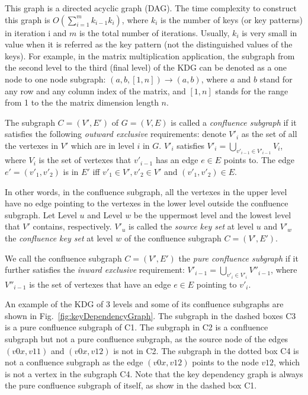 \documentclass[10pt,journal,compsoc]{IEEEtran}
\begin{document}
This graph is a directed acyclic graph (DAG).
The time complexity to construct this graph is $O(\sum_{i=1}^m k_{i-1} k_i)$, 
where $k_i$ is the number of keys (or key patterns) in iteration i and $m$ is the total number of iterations.
Usually, $k_i$ is very small in value when it is referred as the key pattern (not the distinguished values of the keys).
For example, in the matrix multiplication application, the subgraph from the second level to the third (final level) of the KDG can be denoted as a one node to one node subgraph: $(a, b, [1, n]) \rightarrow (a, b)$, 
where $a$ and $b$ stand for any row and any column index of the matrix, 
and $[1, n]$ stands for the range from 1 to the the matrix dimension length $n$.

The subgraph $C=(V', E')$ of $G=(V,E)$ is called a \emph{confluence subgraph} if it satisfies the following
\emph{outward exclusive} requirements: 
denote $V'_i$ as the set of all the vertexes in $V'$ which are in level $i$ in $G$.  
$V'_i$ satisfies $V'_i=\bigcup_{v'_{i-1} \in V'_{i-1}}V_i$, where $V_i$ is the set of vertexes that $v'_{i-1}$ has an edge $e \in E$ points to. 
The edge $e' =(v'_1,v'_2)$ is in $E'$ iff $v'_1 \in V', v'_2 \in V'$ and $(v'_1,v'_2) \in E$.

In other words, in the confluence subgraph, all the vertexes in the upper level have no edge pointing to
the vertexes in the lower level outside the confluence subgraph. 
Let Level $u$ and Level $w$ be the uppermost level and the lowest level that $V'$ contains, respectively. 
$V'_u$ is called the \emph{source key set} at level $u$ and $V'_w$ the \emph{confluence key set} at level $w$
of the confluence subgraph $C=(V',E')$. 

We call the confluence subgraph $C=(V', E')$ the \emph{pure confluence subgraph} if 
it further satisfies the \emph{inward exclusive} requirement: 
$V'_{i-1}=\bigcup_{v'_i \in V'_i}V''_{i-1}$, where $V''_{i-1}$ is the set of vertexes that have an edge $e \in E$ pointing to $v'_i$. 


An example of the KDG of 3 levels and some of its confluence subgraphs are shown in Fig.~\ref{fig:keyDependencyGraph}. The subgraph in the dashed boxes C3 is a pure confluence subgraph 
of C1. The subgraph in C2 is a confluence subgraph but not a pure confluence subgraph, 
as the source node of the edges $(v0x, v11)$ and $(v0x, v12)$ is not in C2. 
The subgraph in the dotted box C4 is not a confluence subgraph as the edge $(v0x, v12)$ 
points to the node $v12$, which is not a vertex in the subgraph C4. 
Note that the key dependency graph is always the pure confluence subgraph of itself, as show in the dashed box C1. 
\end{document}
